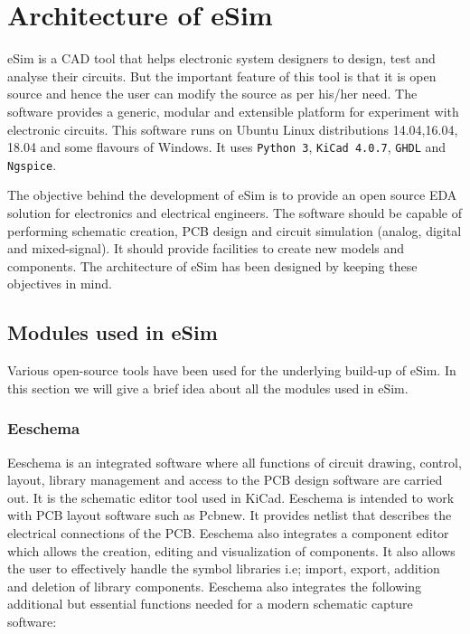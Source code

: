 
\chapter {Architecture of eSim}
\thispagestyle{empty}
\label{chap2}

eSim is a CAD  tool that helps electronic system designers
to design, test and analyse their circuits. But the important feature
of this tool is that it is open source and hence the user can modify
the source as per his/her need. The software provides a generic,
modular and extensible platform for experiment with electronic
circuits. This software runs on Ubuntu Linux distributions 14.04,16.04, 18.04 and 
some flavours of Windows.  It uses {\tt Python 3}, {\tt KiCad 4.0.7},
{\tt GHDL}
and 
{\tt Ngspice}.

The objective behind the development of eSim is to provide an open
source EDA solution for electronics and electrical engineers. The 
software should be capable of performing schematic creation, PCB 
design and circuit simulation (analog, digital and mixed-signal). 
It should provide facilities to create new models and components. 
The architecture of eSim has been designed by keeping these 
objectives in mind. 

\section {Modules used in eSim}
Various open-source tools have been used for the underlying build-up 
of eSim. In this section we will give a brief idea about all the modules 
used in eSim. 

\subsection {Eeschema}  
Eeschema is an integrated software where all functions of circuit
drawing, control, layout, library management and access to the PCB
design software are carried out.  It is the schematic
editor tool used in KiCad. %
Eeschema is intended to
work with PCB layout software such as Pcbnew. It provides netlist that
describes the electrical connections of the PCB. Eeschema also
integrates a component editor which allows the creation, editing and
visualization of components. It also allows the user to effectively
handle the symbol libraries i.e; import, export, addition and deletion
of library components.  Eeschema also integrates the following
additional but essential functions needed for a modern schematic
capture software:

